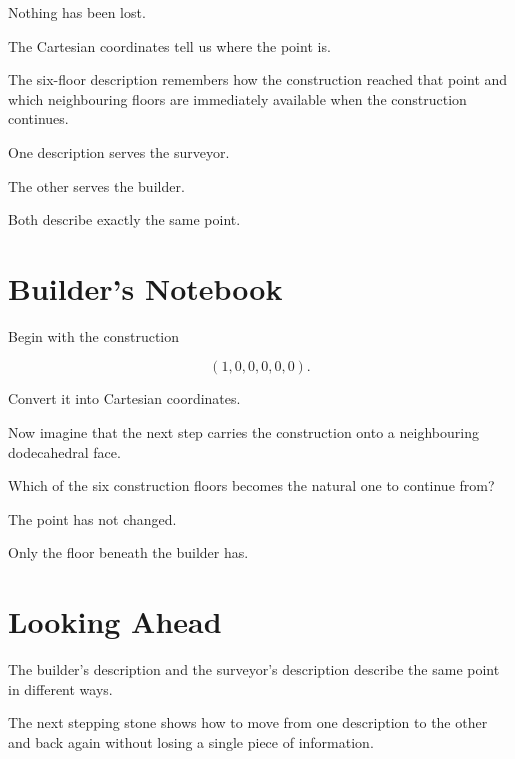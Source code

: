 Nothing has been lost.

The Cartesian coordinates tell us where the point is.

The six-floor description remembers how the construction reached that point and which neighbouring floors are immediately available when the construction continues.

One description serves the surveyor.

The other serves the builder.

Both describe exactly the same point.

\section*{Builder's Notebook}

Begin with the construction

\[
(1,0,0,0,0,0).
\]

Convert it into Cartesian coordinates.

Now imagine that the next step carries the construction onto a neighbouring dodecahedral face.

Which of the six construction floors becomes the natural one to continue from?

The point has not changed.

Only the floor beneath the builder has.

\section*{Looking Ahead}

The builder's description and the surveyor's description describe the same point in different ways.

The next stepping stone shows how to move from one description to the other and back again without losing a single piece of information.
